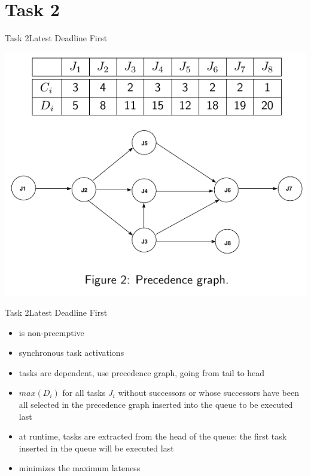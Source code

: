
\section{Task 2}

\setcounter{task}{1}

\begin{frame}[shrink=10]{Task 2}{Latest Deadline First}
  \vspace{0.5cm}
  \begin{task}
    \centering
    \includegraphics[height=0.7\paperheight]{./figures/2_tab_graph.png}
  \end{task}
\end{frame}

\begin{frame}{Task 2}{Latest Deadline First}
  \begin{requirements}
    \begin{itemize}
      \item is \alert{non-preemptive}
      \item \alert{synchronous task activations}
      \item tasks are \alert{dependent}, use \alert{precedence graph}, going from \alert{tail} to \alert{head}
      \item $max(D_i)$ for all tasks $J_i$ \alert{without successors} or whose \alert{successors} have been all selected in the \alert{precedence graph} inserted into the queue to be \alert{executed last}
      \item at runtime, tasks are extracted from the \alert{head of the queue:} the \alert{first task} inserted in the queue will be \alert{executed last}
      \item \alert{minimizes} the \alert{maximum lateness}
    \end{itemize}
  \end{requirements}
\end{frame}

